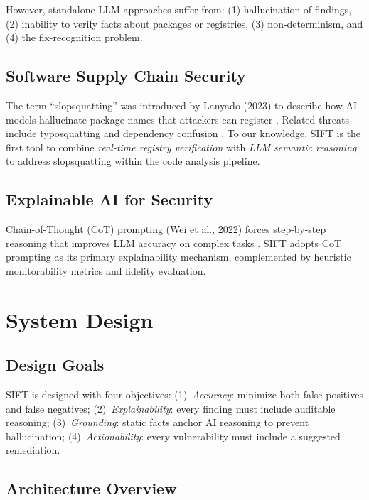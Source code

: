 \documentclass[conference]{IEEEtran}
\begin{document}
However, standalone LLM approaches suffer from: (1) hallucination of findings, (2) inability to verify facts about packages or registries, (3) non-determinism, and (4) the fix-recognition problem.

\subsection{Software Supply Chain Security}

The term ``slopsquatting'' was introduced by Lanyado (2023) to describe how AI models hallucinate package names that attackers can register \cite{b2}. Related threats include typosquatting \cite{b14} and dependency confusion \cite{b15}. To our knowledge, SIFT is the first tool to combine \textit{real-time registry verification} with \textit{LLM semantic reasoning} to address slopsquatting within the code analysis pipeline.

\subsection{Explainable AI for Security}

Chain-of-Thought (CoT) prompting (Wei et al., 2022) forces step-by-step reasoning that improves LLM accuracy on complex tasks \cite{b16}. SIFT adopts CoT prompting as its primary explainability mechanism, complemented by heuristic monitorability metrics and fidelity evaluation.

\section{System Design}

\subsection{Design Goals}

SIFT is designed with four objectives: (1)~\textit{Accuracy}: minimize both false positives and false negatives; (2)~\textit{Explainability}: every finding must include auditable reasoning; (3)~\textit{Grounding}: static facts anchor AI reasoning to prevent hallucination; (4)~\textit{Actionability}: every vulnerability must include a suggested remediation.

\subsection{Architecture Overview}
\end{document}
